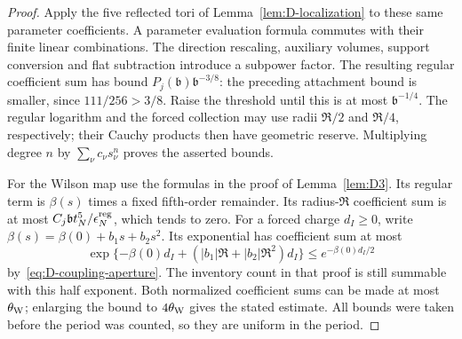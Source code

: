 \begin{proof}
Apply the five reflected tori of Lemma~\ref{lem:D-localization} to these same parameter coefficients. A parameter evaluation formula commutes with their finite linear combinations. The direction rescaling, auxiliary volumes, support conversion and flat subtraction introduce a subpower factor. The resulting regular coefficient sum has bound $P_j(\mathfrak b)\mathfrak b^{-3/8}$: the preceding attachment bound is smaller, since $111/256>3/8$. Raise the threshold until this is at most $\mathfrak b^{-1/4}$. The regular logarithm and the forced collection may use radii $\mathfrak R/2$ and $\mathfrak R/4$, respectively; their Cauchy products then have geometric reserve. Multiplying degree $n$ by $\sum_\nu c_\nu s_\nu^n$ proves the asserted bounds.

For the Wilson map use the formulas in the proof of Lemma~\ref{lem:D3}. Its regular term is $\beta(s)$ times a fixed fifth-order remainder. Its radius-$\mathfrak R$ coefficient sum is at most $C_j\mathfrak b t_N^5/\epsilon_N^{\rm reg}$, which tends to zero. For a forced charge $d_I\ge0$, write $\beta(s)=\beta(0)+b_1s+b_2s^2$. Its exponential has coefficient sum at most
\begin{equation*}
\exp\{-\beta(0)d_I+(|b_1|\mathfrak R+|b_2|\mathfrak R^2)d_I\}
\le e^{-\beta(0)d_I/2}
\end{equation*}
by~\eqref{eq:D-coupling-aperture}. The inventory count in that proof is still summable with this half exponent. Both normalized coefficient sums can be made at most $\theta_{\rm W}$; enlarging the bound to $4\theta_{\rm W}$ gives the stated estimate. All bounds were taken before the period was counted, so they are uniform in the period.
\end{proof}

